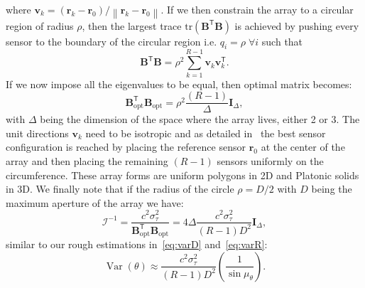 where \({\mathbf{v}}_k=(\mathbf{r}_k-{\mathbf{r}_0}) / \left\|\mathbf{r}_k-{\mathbf{r}_0}\right\|\). If we then constrain the array to a circular region of radius \(\rho\), then the largest trace \(\text{tr}\left(\mathbf{B}^{\mathsf{T}}\mathbf{B}\right)\) is achieved by pushing every sensor to the boundary of the circular region i.e. \(q_i=\rho \;\forall i\) such that 
\begin{equation}
 \mathbf{B}^{\mathsf{T}} \mathbf{B}
 =\rho^2\sum_{k = 1}^{R-1} {\mathbf{v}}_k {\mathbf{v}}_k^{\mathsf{T}}.
\end{equation}
If we now impose all the eigenvalues to be equal, then optimal matrix becomes:
\begin{equation}
 \mathbf{B}_{\text{opt}}^{\mathsf{T}} \mathbf{B}_{\text{opt}}
 =\rho^2 \frac{(R-1)}{\Delta} \mathbf{I}_\Delta,
\end{equation}
with \(\Delta\) being the dimension of the space where the array lives, either 2 or 3.
\noindent
The unit directions \(\mathbf{v}_k\) need to be isotropic and as detailed in~\cite{yang2005cramer} the best sensor configuration is reached by placing the reference sensor \(\mathbf{r}_0\) at the center of the array and then placing the remaining \((R−1)\) sensors uniformly on the circumference. These array forms are uniform polygons in 2D and Platonic solids in 3D. We finally note that if the radius of the circle \(\rho=D/2\) with \(D\) being the maximum aperture of the array we have:
\begin{equation}
\boldsymbol{\mathcal{I}}^{-1}=\frac{c^2\sigma_{\tau}
^2}{\mathbf{B}_\text{opt}^{\mathsf{T}}\mathbf{B}_{\text{opt}}}=4 \Delta  \frac{c^2\sigma_{\tau}^2 }{(R-1) D^2}\mathbf{I}_\Delta,
\end{equation}
similar to our rough estimations in~\eqref{eq:varD} and~\eqref{eq:varR}:
\begin{equation}
\operatorname{Var}(\theta) \approx
\frac{c^2\sigma_{\tau}^2}{(R-1)D^2}
\left(\frac{1}{\sin \mu_\theta}\right).
\end{equation}